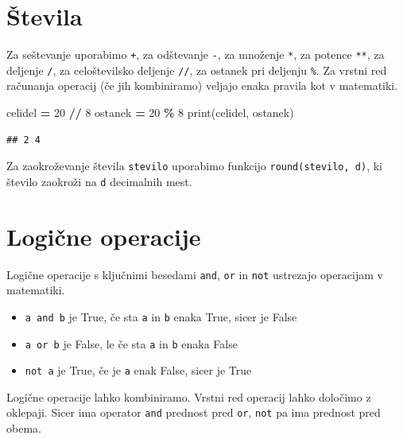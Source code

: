 \documentclass[
]{report}
\newenvironment{Shaded}{\begin{snugshade}}{\end{snugshade}}
\newcommand{\BuiltInTok}[1]{#1}
\newcommand{\DecValTok}[1]{\textcolor[rgb]{0.00,0.00,0.81}{#1}}
\newcommand{\NormalTok}[1]{#1}
\newcommand{\OperatorTok}[1]{\textcolor[rgb]{0.81,0.36,0.00}{\textbf{#1}}}
\providecommand{\tightlist}{%
  \setlength{\itemsep}{0pt}\setlength{\parskip}{0pt}}
\begin{document}
\hypertarget{ux161tevila}{%
\section{Števila}\label{ux161tevila}}

Za seštevanje uporabimo \texttt{+}, za odštevanje \texttt{-}, za množenje \texttt{*}, za potence \texttt{**},
za deljenje \texttt{/}, za celoštevilsko deljenje \texttt{//}, za ostanek pri deljenju \texttt{\%}.
Za vrstni red računanja operacij (če jih kombiniramo) veljajo enaka pravila kot
v matematiki.

\begin{Shaded}
\begin{Highlighting}[]
\NormalTok{celidel }\OperatorTok{=} \DecValTok{20} \OperatorTok{//} \DecValTok{8}
\NormalTok{ostanek }\OperatorTok{=} \DecValTok{20} \OperatorTok{\%} \DecValTok{8}
\BuiltInTok{print}\NormalTok{(celidel, ostanek)}
\end{Highlighting}
\end{Shaded}

\begin{verbatim}
## 2 4
\end{verbatim}

Za zaokroževanje števila \texttt{stevilo} uporabimo funkcijo \texttt{round(stevilo,\ d)}, ki število zaokroži na \texttt{d} decimalnih mest.

\hypertarget{logiux10dne-operacije}{%
\section{Logične operacije}\label{logiux10dne-operacije}}

Logične operacije s ključnimi besedami \texttt{and}, \texttt{or} in \texttt{not} ustrezajo operacijam v matematiki.

\begin{itemize}
\tightlist
\item
  \texttt{a\ and\ b} je True, če sta \texttt{a} in \texttt{b} enaka True, sicer je False
\item
  \texttt{a\ or\ b} je False, le če sta \texttt{a} in \texttt{b} enaka False
\item
  \texttt{not\ a} je True, če je \texttt{a} enak False, sicer je True
\end{itemize}

Logične operacije lahko kombiniramo. Vrstni red operacij lahko določimo z oklepaji.
Sicer ima operator \texttt{and} prednost pred \texttt{or}, \texttt{not} pa ima prednost pred obema.
\end{document}

